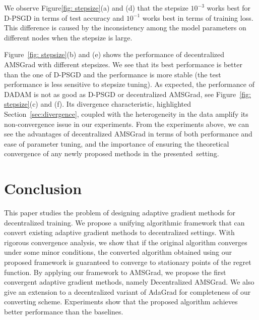 \documentclass[11pt]{article}
\begin{document}
\vspace{0.05in}

We observe Figure\ref{fig: stepsize}(a) and (d) that the stepsize $10^{-3}$ works best for D-PSGD in terms of test accuracy and $10^{-1}$ works best in terms of training loss. 
This difference is caused by the inconsistency among the model parameters on different nodes when the stepsize is large. 


\vspace{0.05in}

Figure~\ref{fig: stepsize}(b) and (e) shows the performance of decentralized AMSGrad with different stepsizes.
We see that its best performance is better than the one of D-PSGD and the performance is more stable (the test performance is less sensitive to stepsize tuning).
As expected, the performance of DADAM is not as good as D-PSGD or decentralized AMSGrad, see Figure~\ref{fig: stepsize}(c) and (f).
Its divergence characteristic, highlighted Section~\ref{sec:divergence}, coupled with the heterogeneity in the data amplify its non-convergence issue in our experiments.  
From the experiments above, we can see the advantages of decentralized AMSGrad in terms of both performance and ease of parameter tuning, and the importance of ensuring the theoretical convergence of any newly proposed methods in the presented~setting. 


\section{Conclusion}\label{sec:conclusion}


This paper studies the problem of designing adaptive gradient methods for decentralized training. 
We propose a unifying algorithmic framework that can convert existing adaptive gradient methods to decentralized settings. 
With rigorous convergence analysis, we show that if the original algorithm converges under some minor conditions, the converted algorithm obtained using our proposed framework is guaranteed to converge to stationary points of the regret function. 
By applying our framework to AMSGrad, we propose the first convergent adaptive gradient methods, namely Decentralized AMSGrad. 
We also give an extension to a decentralized variant of AdaGrad for completeness of our converting scheme.
Experiments show that the proposed algorithm achieves better performance than the baselines. 
\end{document}
